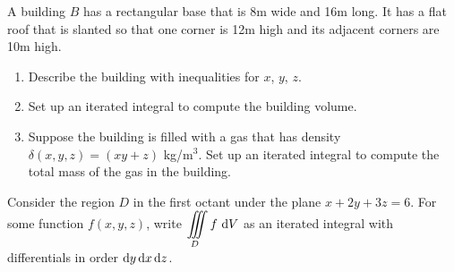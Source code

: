 \begin{ex}
    A building $B$ has a rectangular base that is 8m wide and 16m long. It has a flat roof that is slanted so that one corner is 12m high and its adjacent corners are 10m high.
    \begin{enumerate}
        \item Describe the building with inequalities for $x$, $y$, $z$.
        \item Set up an iterated integral to compute the building volume.%
        \item Suppose the building is filled with a gas that has density $\delta(x,y,z)=(xy+z)$ kg/m$^3$. Set up an iterated integral to compute the total mass of the gas in the building.
    \end{enumerate}
\end{ex}

\vfill


\pagebreak 

\begin{ex}
    Consider the region $D$ in the first octant under the plane $x+2y+3z=6$. For some function $f(x,y,z)$, write $\displaystyle\iiint\limits_D f\,\mathop{}\!\mathrm{d} V$ as an iterated integral with differentials in order $\mathop{}\!\mathrm{d} y \mathop{}\!\mathrm{d} x \mathop{}\!\mathrm{d} z$. %
\end{ex}
\vfill

